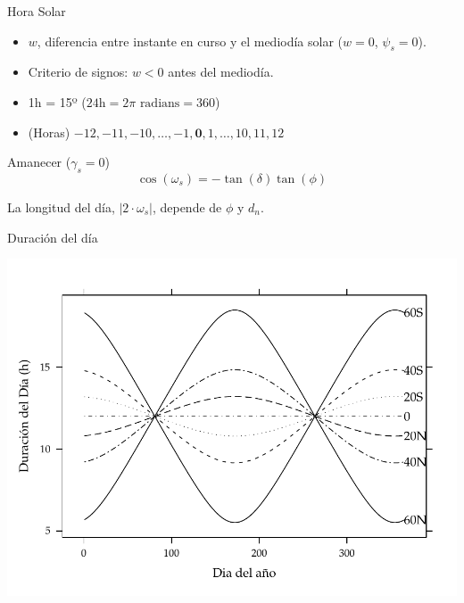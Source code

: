 \documentclass[xcolor={usenames,svgnames,dvipsnames}]{beamer}
\begin{document}
\begin{frame}[label={sec:org12bd358}]{Hora Solar}
\begin{itemize}
\item \(w\), diferencia entre instante en curso y el mediodía solar (\(w = 0\), \(\psi_s = 0\)).
\item Criterio de signos: \(w < 0\) antes del mediodía.
\item 1h = 15º (\(24\text{h} = 2\pi \text{ radians} = 360\))
\item (Horas) \(-12, -11, -10, \dots, -1, \textbf{0}, 1, \dots, 10, 11, 12\)
\end{itemize}

\begin{block}{Amanecer (\(\gamma_{s}=0\))}
\[
\cos(\omega_{s}) = -\tan(\delta)\tan(\phi)
\]

La longitud del día, \(|2 \cdot \omega_s|\), depende de \(\phi\) y \(d_n\).
\end{block}
\end{frame}

\begin{frame}[label={sec:org191e29a}]{Duración del día}
\begin{center}
\includegraphics[width=.9\linewidth]{../figs/DuracionDia.pdf}
\end{center}
\end{frame}
\end{document}
